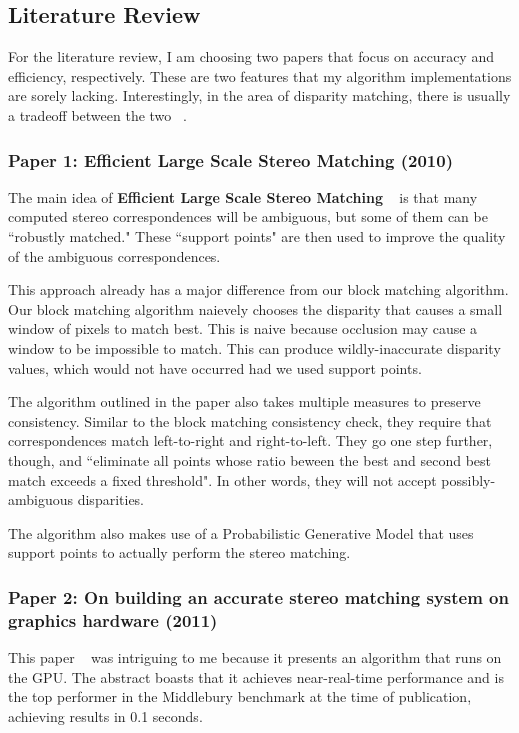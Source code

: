 \documentclass[12pt]{article}
\begin{document}
\subsection{Literature Review}

For the literature review, I am choosing two papers that focus on accuracy and
efficiency, respectively. These are two features that my algorithm
implementations are sorely lacking. Interestingly, in the area of disparity
matching, there is usually a tradeoff between the two ~\cite{papertwo}.

\subsubsection{Paper 1: \textbf{Efficient Large Scale Stereo Matching} (2010)}
The main idea of \textbf{Efficient Large Scale Stereo Matching} ~\cite{paperone} is that many
computed stereo correspondences will be ambiguous, but some of them can be
``robustly matched." These ``support points" are then used to improve the
quality of the ambiguous correspondences.

This approach already has a major difference from our block matching algorithm.
Our block matching algorithm naievely chooses the disparity that causes a small
window of pixels to match best. This is naive because occlusion may cause a
window to be impossible to match. This can produce wildly-inaccurate disparity
values, which would not have occurred had we used support points. 

The algorithm outlined in the paper also takes multiple measures to preserve
consistency.  Similar to the block matching consistency check, they require
that correspondences match left-to-right and right-to-left.  They go one step
further, though, and ``eliminate all points whose ratio beween the best and
second best match exceeds a fixed threshold". In other words, they will not
accept possibly-ambiguous disparities.

The algorithm also makes use of a Probabilistic Generative Model that uses
support points to actually perform the stereo matching.


\subsubsection{Paper 2: \textbf{On building an accurate stereo matching system on graphics hardware} (2011)}

This paper ~\cite{papertwo} was intriguing to me because it presents an algorithm that runs on
the GPU. The abstract boasts that it achieves near-real-time performance and is
the top performer in the Middlebury benchmark at the time of publication,
achieving results in 0.1 seconds. 
\end{document}
